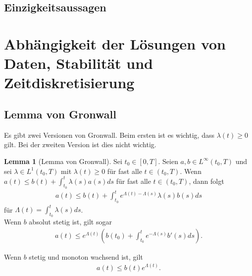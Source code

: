 \documentclass[a4paper]{article}
\theoremstyle{definition}
\newtheorem{lemma}[theorem]{Lemma}
\begin{document}
\subsection{Einzigkeitsaussagen}


\section{Abhängigkeit der Lösungen von Daten, Stabilität und Zeitdiskretisierung}

\subsection{Lemma von Gronwall}
Es gibt zwei Versionen von Gronwall. Beim ersten ist es wichtig, dass $\lambda(t) \geq 0$ gilt. Bei der zweiten Version ist dies nicht wichtig.

\begin{lemma}[Lemma von Gronwall]
Sei $t_0 \in [0,T]$. Seien $a,b \in L^\infty(t_0, T)$ und sei $\lambda \in L^1(t_0, T)$ mit $\lambda(t) \geq 0$ für fast alle $t \in (t_0, T)$. Wenn $a(t) \leq b(t) + \int^t_{t_0} \lambda(s) a(s) ds$ für fast alle $t \in (t_0, T)$, dann folgt 
\begin{align*}
    a(t) \leq b(t) + \int^t_{t_0}e^{\Lambda(t) - \Lambda(s)}\lambda(s) b(s) ds
\end{align*}
für $\Lambda(t) = \int^t_{t_0} \lambda(s) ds$.\\

Wenn $b$ absolut stetig ist, gilt sogar 
\begin{align*}
    a(t) \leq e^{\Lambda(t)}\left(b(t_0) + \int^t_{t_0} e^{-\Lambda(s)} b'(s) ds\right).
\end{align*}

Wenn $b$ stetig und monoton wachsend ist, gilt 
\begin{align*}
    a(t) \leq b(t)e^{\Lambda(t)}.
\end{align*}
\end{lemma}
\end{document}
